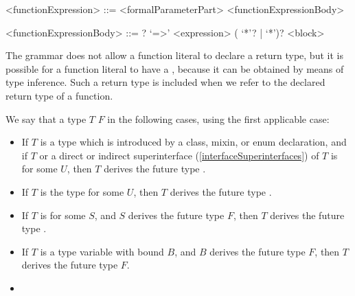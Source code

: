 \documentclass[makeidx]{article}
\begin{document}
{%
\begin{grammar}
<functionExpression> ::= <formalParameterPart> <functionExpressionBody>

<functionExpressionBody> ::= \ASYNC? `=>' <expression>
  \alt (\ASYNC{} `*'? | \SYNC{} `*')? <block>
\end{grammar}

\LMHash{}%
The grammar does not allow a function literal to declare a return type,
but it is possible for a function literal to have a
,
because it can be obtained by means of type inference.
Such a return type is included
when we refer to the declared return type of a function.


\LMHash{}%
We say that a type $T$
$F$ in the following cases, using the first applicable case:

\begin{itemize}
\item
  If $T$ is a type which is introduced by
  a class, mixin, or enum declaration,
  and if $T$ or a direct or indirect superinterface
  (\ref{interfaceSuperinterfaces})
  of $T$ is  for some $U$,
  then $T$ derives the future type .
\item
  If $T$ is the type  for some $U$,
  then $T$ derives the future type .
\item
  If $T$ is  for some $S$, and
  $S$ derives the future type $F$,
  then $T$ derives the future type .
\item
  If $T$ is a type variable with bound $B$, and
  $B$ derives the future type $F$,
  then $T$ derives the future type $F$.
\item
\end{itemize}

}
\end{document}
